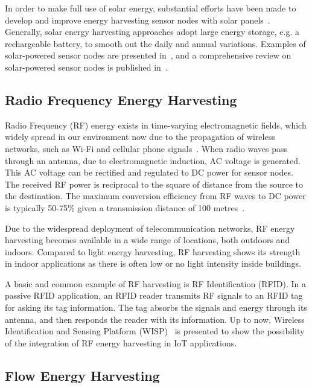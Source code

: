 In order to make full use of solar energy, substantial efforts have been made to develop and improve energy harvesting sensor nodes with solar panels~\cite{raghunathan2005design, seah2009wireless}. Generally, solar energy harvesting approaches adopt large energy storage, e.g. a rechargeable battery, to smooth out the daily and annual variations. Examples of solar-powered sensor nodes are presented in~\cite{raghunathan2005design, corke2007long, kansal2007power}, and a comprehensive review on solar-powered sensor nodes is published in~\cite{sudevalayam2011energy}. 

\subsection{Radio Frequency Energy Harvesting}

Radio Frequency (RF) energy exists in time-varying electromagnetic fields, which widely spread in our environment now due to the propagation of wireless networks, such as Wi-Fi and cellular phone signals~\cite{parks2013wireless}. When radio waves pass through an antenna, due to electromagnetic induction, AC voltage is generated. This AC voltage can be rectified and regulated to DC power for sensor nodes. The received RF power is reciprocal to the square of distance from the source to the destination. The maximum conversion efficiency from RF waves to DC power is typically 50-75\% given a transmission distance of 100 metres~\cite{shaikh2016energy}.

Due to the widespread deployment of telecommunication networks, RF energy harvesting becomes available in a wide range of locations, both outdoors and indoors. Compared to light energy harvesting, RF harvesting shows its strength in indoor applications as there is often low or no light intensity inside buildings. 

A basic and common example of RF harvesting is RF Identification (RFID). In a passive RFID application, an RFID reader transmits RF signals to an RFID tag for asking its tag information. The tag absorbs the signals and energy through its antenna, and then responds the reader with its information. Up to now, Wireless Identification and Sensing Platform (WISP)~\cite{sample2008design, naderiparizi2015wispcam} is presented to show the possibility of the integration of RF energy harvesting in IoT applications.

\subsection{Flow Energy Harvesting}

